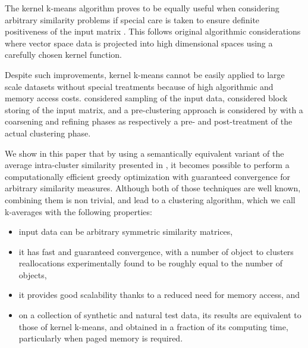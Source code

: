 \documentclass[natbib,smallextended]{svjour3}
\begin{document}
The kernel k-means algorithm proves to be equally useful when considering arbitrary similarity problems if special care is taken to ensure definite positiveness of the input matrix \citep{Roth:2003:OCP:960254.960291}. This follows original algorithmic considerations where vector space data is projected into high dimensional spaces using a carefully chosen kernel function.


Despite such improvements, kernel k-means cannot be easily applied to large scale datasets without special treatments because of high algorithmic and memory access costs.
\citet{Chitta:2011:AKK:2020408.2020558} considered sampling of the input data, \citet{1047453} considered block storing of the input matrix, and a pre-clustering  approach \citet{bradley98scaling} is considered by \citet{Kulis2008} with a coarsening and refining phases as respectively a pre- and post-treatment of the actual clustering phase.

We show in this paper that by using a semantically equivalent variant of the average intra-cluster similarity presented in \citep[Chapter 10.7]{Duda01}, it becomes possible to perform a computationally efficient greedy optimization \citep[Chapter 10.8]{Duda01} with guaranteed convergence for arbitrary similarity measures. Although both of those techniques are well known, combining them is non trivial, and lead to a clustering algorithm, which we call k-averages with the following properties:
\begin{itemize}
\item input data can be arbitrary symmetric similarity matrices,
\item it has fast and guaranteed convergence, with a number of object to clusters reallocations experimentally found to be roughly equal to the number of objects,
\item it provides good scalability thanks to a reduced need for memory access, and
\item on a collection of synthetic and natural test data, its results are equivalent to those of kernel k-means, and obtained in a fraction of its computing time, particularly when paged memory is required.
\end{itemize}
\end{document}
